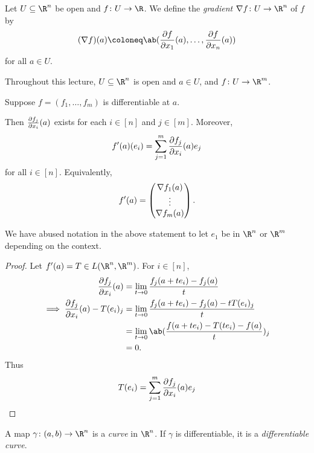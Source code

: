 \begin{definition*}[gradient] \label{def:gradient}
    Let $U \subseteq \R^n$ be open and $f\colon U \to \R$.
    We define the \emph{gradient} $\grad f\colon U \to \R^n$ of $f$ by \[
        (\grad f)(a) \coloneq
        \ab(\pdv{f}{x_1}(a), \ldots, \pdv{f}{x_n}(a))
    \] for all $a \in U$.
\end{definition*}
Throughout this lecture, $U \subseteq \R^n$ is open and $a \in U$,
and $f\colon U \to \R^m$.

\begin{proposition*}
    Suppose $f = (f_1, \dots, f_m)$ is differentiable at $a$.

    Then $\pdv{f_j}{x_i}(a)$ exists for each $i \in [n]$ and $j \in [m]$.
    Moreover, \[
        f'(a)(e_i) = \sum_{j=1}^m \pdv{f_j}{x_i}(a) e_j
    \] for all $i \in [n]$.
    Equivalently, \[
        f'(a) = \begin{pmatrix}
            \nabla f_1(a) \\
            \vdots \\
            \nabla f_m(a)
        \end{pmatrix}.
    \]
\end{proposition*}
We have abused notation in the above statement to let $e_1$ be in
$\R^n$ or $\R^m$ depending on the context.
\begin{proof}
    Let $f'(a) = T \in L(\R^n, \R^m)$.
    For $i \in [n]$, \begin{align*}
        \pdv{f_j}{x_i}(a)
            &= \lim_{t \to 0} \frac{f_j(a+te_i) - f_j(a)}{t} \\
        \implies \pdv{f_j}{x_i}(a) - T(e_i)_j
            &= \lim_{t \to 0} \frac{f_j(a+te_i) - f_j(a) - tT(e_i)_j}{t} \\
            &= \lim_{t \to 0} \ab(\frac{f(a+te_i) - T(te_i) - f(a)}t)_j \\
            &= 0.
    \end{align*}
    Thus \[
        T(e_i) = \sum_{j=1}^m \pdv{f_j}{x_i}(a) e_j \qedhere
    \]
\end{proof}

\begin{definition*}[curve] \label{def:curve}
    A map $\gamma\colon (a, b) \to \R^n$ is a \emph{curve} in $\R^n$.
    If $\gamma$ is differentiable, it is a \emph{differentiable curve}.
\end{definition*}

